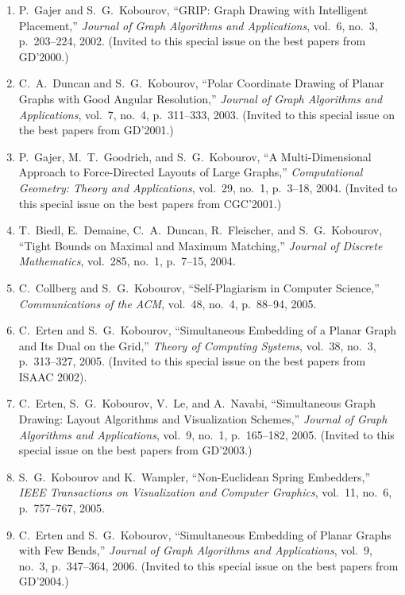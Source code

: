 \documentclass[10pt]{article}
\begin{document}
\begin{description}
\begin{enumerate}
\item\label{grip}
P.~Gajer and S.~G.~Kobourov, ``GRIP: Graph Drawing with Intelligent
Placement,'' {\em Journal of Graph Algorithms and Applications}, vol.~6,
no.~3, p.~203--224, 2002. (Invited to this special issue on the best
papers from GD'2000.) 


\item\label{polar}
C.~A.~Duncan and S.~G.~Kobourov, ``Polar Coordinate Drawing of Planar
Graphs with Good Angular Resolution,'' {\em Journal of Graph
Algorithms and Applications}, vol.~7, no.~4, p.~311--333, 2003. (Invited
to this special issue on the best papers from GD'2001.)

\item\label{fmda}
P.~Gajer, M.~T.~Goodrich, and S.~G.~Kobourov, ``A Multi-Dimensional Approach to Force-Directed Layouts of Large Graphs,'' {\em
Computational Geometry: Theory and Applications}, vol.~29, no.~1, p.~3--18, 2004.  (Invited to this special issue on the best papers from
CGC'2001.)

\item\label{matching}T.~Biedl, E.~Demaine, C.~A.~Duncan, R.~Fleischer, and S.~G.~Kobourov,
``Tight Bounds on Maximal and Maximum Matching,'' {\em Journal of
Discrete Mathematics}, vol.~285, no.~1, p.~7--15, 2004.


\item
C.~Collberg and S.~G.~Kobourov, ``Self-Plagiarism in Computer
Science,'' {\em Communications of the ACM},  vol.~48, no.~4, p.~88--94, 2005.


\item\label{planardual}
C.~Erten and S.~G.~Kobourov, ``Simultaneous Embedding of a Planar
Graph and Its Dual on the Grid,'' {\em Theory of Computing Systems}, vol.~38, no.~3, p.~313--327, 2005. (Invited to this special issue on the best papers
from ISAAC 2002).

\item  \label{simg}
C.~Erten, S.~G.~Kobourov, V.~Le, and A.~Navabi, ``Simultaneous Graph
Drawing: Layout Algorithms and Visualization Schemes,'' {\em Journal of Graph
Algorithms and Applications}, vol.~9, no.~1, p.~165--182, 2005. (Invited to this special issue on the best papers from GD'2003.)


\item \label{riemann} 
S.~G.~Kobourov and K.~Wampler, ``Non-Euclidean Spring Embedders,'' {\em IEEE Transactions on Visualization and Computer Graphics}, vol.~11, no.~6, p.~757--767, 2005.

\item \label{fewbends} C.~Erten and S.~G.~Kobourov, ``Simultaneous Embedding of Planar Graphs with Few Bends,''  {\em Journal of Graph
Algorithms and Applications}, vol.~9, no.~3, p.~347--364, 2006. (Invited to this special issue on the best papers from GD'2004.)



\end{enumerate}
\end{description}
\end{document}
